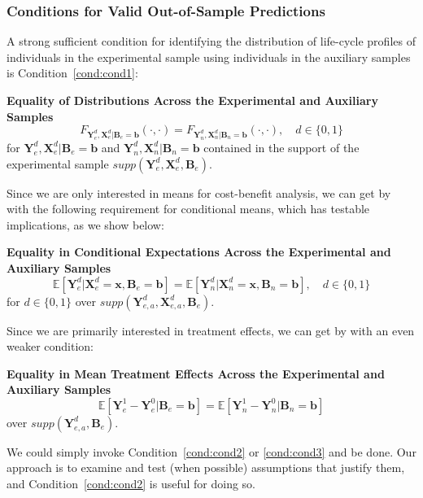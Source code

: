\subsubsection{Conditions for Valid Out-of-Sample Predictions}

A strong sufficient condition for identifying the distribution of life-cycle profiles of individuals in the experimental sample using individuals in the auxiliary samples is Condition~\ref{cond:cond1}:

\onehalfspacing
\begin{condition} \textbf{Equality of Distributions Across the Experimental and Auxiliary Samples \label{cond:cond1}}
\begin{equation}
F_{\bm{Y}_e^d, \bm{X}_e^d | \bm{B}_e = \bm{b}} \left( \cdot, \cdot \right) = F_{\bm{Y}_n^d, \bm{X}_n^d | \bm{B}_n = \bm{b}} \left( \cdot, \cdot \right), \quad d \in \{0,1\}
\end{equation}
\noindent for $\bm{Y}_e^d, \bm{X}^d_e | \bm{B}_e = \bm{b}$ and $\bm{Y}_n^d, \bm{X}^d_n | \bm{B}_n = \bm{b}$ contained in the support of the experimental sample $supp\left(\bm{Y}^d_{e}, \bm{X}^d_{e}, \bm{B}_{e} \right)$.
\end{condition}
\doublespacing

Since we are only interested in means for cost-benefit analysis, we can get by with the following requirement for conditional means, which has testable implications, as we show below:

\onehalfspacing
\begin{condition} \textbf{Equality in Conditional Expectations Across the Experimental and Auxiliary Samples \label{cond:cond2}}
\begin{equation}
\mathbb{E} \left[ \bm{Y}_e^d |  \bm{X}_e^d = \bm{x}, \bm{B}_e = \bm{b} \right] = \mathbb{E} \left[ \bm{Y}_n^d |  \bm{X}_n^d = \bm{x}, \bm{B}_n = \bm{b} \right], \quad d \in \{0,1\}
\end{equation}
for $d \in \{0, 1 \}$ over $supp\left(\bm{Y}^d_{e,a}, \bm{X}^d_{e,a}, \bm{B}_e\right)$.
\end{condition}
\doublespacing

Since we are primarily interested in treatment effects, we can get by with an even weaker condition:

\onehalfspacing
\begin{condition} \textbf{Equality in Mean Treatment Effects Across the Experimental and Auxiliary Samples \label{cond:cond3}}
\begin{equation}
\mathbb{E} \left[ \bm{Y}_e^1 - \bm{Y}_e^0 | \bm{B}_e = \bm{b} \right] = \mathbb{E} \left[ \bm{Y}_n^1 - \bm{Y}_n^0 | \bm{B}_n = \bm{b} \right]
\end{equation}
over $supp\left(\bm{Y}^d_{e,a}, \bm{B}_e\right)$.
\end{condition}
\doublespacing
We could simply invoke Condition~\ref{cond:cond2} or \ref{cond:cond3} and be done. Our approach is to examine and test (when possible) assumptions that justify them, and Condition~\ref{cond:cond2} is useful for doing so.

